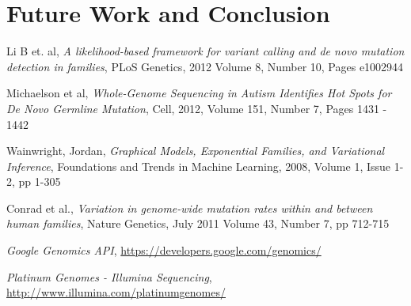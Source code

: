\documentclass{article}
\begin{document}
\section{Future Work and Conclusion}

\clearpage

\begin{thebibliography}{10}

   Li B et. al,
   \emph{A likelihood-based framework for variant calling and de novo mutation detection in families},
   PLoS Genetics, 2012
   Volume 8, Number 10, Pages e1002944

   Michaelson et al,
   \emph{Whole-Genome Sequencing in Autism Identifies Hot Spots for De Novo Germline Mutation},  
   Cell, 2012, 
   Volume 151, Number 7, Pages 1431 - 1442

	Wainwright, Jordan,
	\emph{Graphical Models, Exponential Families, and Variational Inference},
	Foundations and Trends in Machine Learning, 2008,
	Volume 1, Issue 1-2, pp 1-305	

	Conrad et al., 
	\emph{Variation in genome-wide mutation rates within and between human families},
	Nature Genetics, July 2011
	Volume 43, Number 7, pp 712-715

	\emph{Google Genomics API},
	\url{https://developers.google.com/genomics/}

	\emph{Platinum Genomes - Illumina Sequencing},
	\url{http://www.illumina.com/platinumgenomes/}
	
\end{thebibliography}
\end{document}
